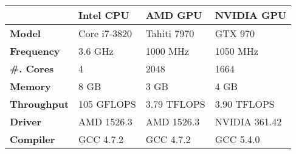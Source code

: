 \begin{tabular}{| l l l l |}
  \hline
  \rowcolor{gray!50}
  & \textbf{Intel CPU} & \textbf{AMD GPU} & \textbf{NVIDIA GPU} \\
  \hline
  \textbf{Model} & Core i7-3820 & Tahiti 7970 & GTX 970 \\
  \textbf{Frequency} & 3.6 GHz & 1000 MHz & 1050 MHz \\
  \textbf{\#. Cores} & 4 & 2048 & 1664 \\
  \textbf{Memory} & 8 GB & 3 GB & 4 GB \\
  \textbf{Throughput} & 105 GFLOPS & 3.79 TFLOPS & 3.90 TFLOPS \\
  \textbf{Driver} & AMD 1526.3 & AMD 1526.3 & NVIDIA 361.42 \\
  \textbf{Compiler} & GCC 4.7.2 & GCC 4.7.2 & GCC 5.4.0 \\
  \hline
\end{tabular}
